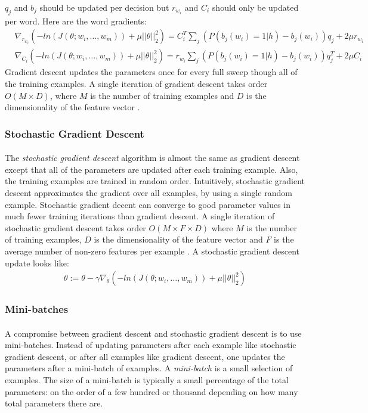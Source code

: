 \documentclass[12pt]{ociamthesis}  %
\begin{document}
$q_j$ and $b_j$ should be updated per decision but $r_{w_i}$ and $C_i$ should only be updated per word. Here are the word gradients:
\begin{align}
& \nabla_{r_{w_i}} \left( -ln(J(\theta;w_i,\dots, w_m)) +  \mu ||\theta||^2_2 \right)  =  C_i^T \sum_j \left( P \left(b_j(w_i) = 1 | h \right)  - b_j(w_i) \right)q_j +2\mu r_{w_i} \nonumber
\\
& \nabla_{C_i} \left( -ln(J(\theta;w_i,\dots, w_m)) +  \mu ||\theta||^2_2 \right)  =  r_{w_i} \sum_j \left( P \left(b_j(w_i) = 1 | h \right) - b_j(w_i) \right) q_j^T  +2\mu C_i
\end{align}
Gradient descent updates the parameters once for every full sweep though all of the training examples. A single iteration of gradient descent takes order $O(M\times D)$, where $M$ is the number of training examples and $D$ is the dimensionality of the feature vector \cite{Elkan2013}. 

\subsubsection{Stochastic Gradient Descent}
\paragraph{}
The \emph{stochastic gradient descent} algorithm is almost the same as gradient descent except that all of the parameters are updated after each training example. Also, the training examples are trained in random order. Intuitively, stochastic gradient descent approximates the gradient over all examples, by using a single random example. Stochastic gradient decent can converge to good parameter values in much fewer training iterations than gradient descent. A single iteration of stochastic gradient descent takes order $O(M\times F \times D)$ where $M$ is the number of training examples, $D$ is the dimensionality of the feature vector and $F$ is the average number of non-zero features per example \cite{Elkan2013}. 
A stochastic gradient descent update looks like:
\begin{align}
\theta := \theta - \gamma \nabla_\theta \left( -ln(J(\theta;w_i,\dots, w_m)) +  \mu ||\theta||^2_2 \right)
\end{align}
\subsubsection{Mini-batches}
\paragraph{}
A compromise between gradient descent and stochastic gradient descent is to use mini-batches. Instead of updating parameters after each example like stochastic gradient descent, or after all examples like gradient descent, one updates the parameters after a mini-batch of examples. A \emph{mini-batch} is a small selection of examples. The size of a mini-batch is typically a small percentage of the total parameters: on the order of a few hundred or thousand depending on how many total parameters there are.
\end{document}
